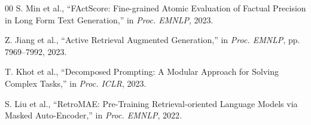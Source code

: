 \documentclass[conference]{IEEEtran}
\begin{document}
\begin{thebibliography}{00}
S. Min et al., ``FActScore: Fine-grained Atomic Evaluation of Factual Precision in Long Form Text Generation,'' in \textit{Proc. EMNLP}, 2023.

Z. Jiang et al., ``Active Retrieval Augmented Generation,'' in \textit{Proc. EMNLP}, pp. 7969--7992, 2023.

T. Khot et al., ``Decomposed Prompting: A Modular Approach for Solving Complex Tasks,'' in \textit{Proc. ICLR}, 2023.

S. Liu et al., ``RetroMAE: Pre-Training Retrieval-oriented Language Models via Masked Auto-Encoder,'' in \textit{Proc. EMNLP}, 2022.

\end{thebibliography}
\end{document}
